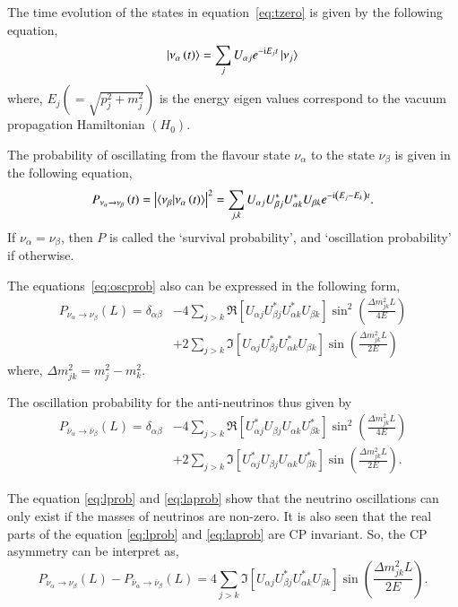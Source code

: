 The time evolution of the states in equation~\ref{eq:tzero} is given
by the following equation,
\begin{equation}
  \ket{\nu_{\alpha}\left(t\right)}=\sum_{j}U_{\alpha j}e^{-\mathrm{i}E_{j}t}\ket{\nu_{j}} \label{eq:ttime}
\end{equation}
where, $E_{j}\left(=\sqrt{p_{j}^{2}+m_{j}^{2}}\right)$ is the energy
eigen values correspond to the vacuum propagation Hamiltonian
$\left(H_0\right)$.

The probability of oscillating from the flavour state $\nu_\alpha$ to
the state $\nu_\beta$ is given in the following equation,
\begin{equation}
  P_{\nu_\alpha\rightarrow\nu_\beta}\left(t\right) = \left|\braket{\nu_\beta|\nu_\alpha\left(t\right)}\right|^2 = \sum_{j,k}U_{\alpha j}U^{*}_{\beta j}U^{*}_{\alpha k}U_{\beta k}e^{-\mathrm{i}\left(E_{j}-E_{k}\right)t}.
  \label{eq:oscprob}
\end{equation}
If $\nu_\alpha=\nu_\beta$, then $P$ is called the `survival probability',
and `oscillation probability' if otherwise.

The equations~\ref{eq:oscprob} also can be expressed in the following
form,
\begin{align}
  P_{\nu_\alpha\rightarrow\nu_\beta}\left(L\right) = \delta_{\alpha\beta} & -4\sum_{j>k}\Re\left[U_{\alpha j}U^{*}_{\beta j}U^{*}_{\alpha k}U_{\beta k}\right]\sin^2\left(\frac{\Delta m^2_{jk}L}{4E}\right) \nonumber\\
  & +2\sum_{j>k}\Im\left[U_{\alpha j}U^{*}_{\beta j}U^{*}_{\alpha k}U_{\beta k}\right]\sin\left(\frac{\Delta m^2_{jk}L}{2E}\right)
  \label{eq:lprob}
\end{align}
where, $\Delta m^2_{jk}=m^2_{j}-m^2_{k}$.

The oscillation probability for the anti-neutrinos thus given by
\begin{align}
  P_{\bar{\nu}_\alpha\rightarrow\bar{\nu}_\beta}\left(L\right) = \delta_{\alpha\beta} & -4\sum_{j>k}\Re\left[U^{*}_{\alpha j}U_{\beta j}U_{\alpha k}U^{*}_{\beta k}\right]\sin^2\left(\frac{\Delta m^2_{jk}L}{4E}\right) \nonumber\\
  & +2\sum_{j>k}\Im\left[U^{*}_{\alpha j}U_{\beta j}U_{\alpha k}U^{*}_{\beta k}\right]\sin\left(\frac{\Delta m^2_{jk}L}{2E}\right).
  \label{eq:laprob}
\end{align}

The equation \ref{eq:lprob} and \ref{eq:laprob} show that the neutrino
oscillations can only exist if the masses of neutrinos are
non-zero. It is also seen that the real parts of the equation
\ref{eq:lprob} and \ref{eq:laprob} are CP invariant. So, the CP
asymmetry can be interpret as,
\begin{equation}  P_{\nu_\alpha\rightarrow\nu_\beta}\left(L\right)-P_{\bar{\nu}_\alpha\rightarrow\bar{\nu}_\beta}\left(L\right) = 4\sum_{j>k}\Im\left[U_{\alpha j}U^{*}_{\beta j}U^{*}_{\alpha k}U_{\beta k}\right]\sin\left(\frac{\Delta m^2_{jk}L}{2E}\right).
  \label{eq:cpass}
\end{equation}

